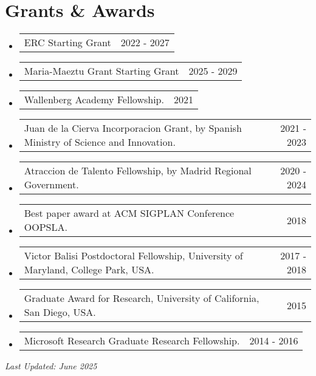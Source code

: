 \documentclass[letterpaper,11pt]{article}
\makeatletter
\newcommand{\resumeProjectHeading}[2]{
    \item
    \begin{tabular*}{0.97\textwidth}{l@{\extracolsep{\fill}}r}
      \small#1 & #2 \\
    \end{tabular*}\vspace{-7pt}
}
\newcommand{\resumeSubHeadingListStart}{\begin{itemize}[leftmargin=0.15in, label={}]}
\newcommand{\resumeSubHeadingListEnd}{\end{itemize}}
\makeatother
\begin{document}
 \section{Grants \& Awards}
 \resumeSubHeadingListStart
 \resumeProjectHeading
     {ERC Starting Grant}{2022 - 2027}
 \resumeProjectHeading
     {Maria-Maeztu Grant Starting Grant}{2025 - 2029}
 \resumeProjectHeading
     {Wallenberg Academy Fellowship.}{2021}
 \resumeProjectHeading
     {Juan de la Cierva Incorporacion Grant, by Spanish Ministry of Science and Innovation.}{2021 - 2023}
 \resumeProjectHeading
     {Atraccion de Talento Fellowship, by Madrid Regional Government.}{2020 - 2024}
 \resumeProjectHeading
     {Best paper award at ACM SIGPLAN Conference OOPSLA.}{2018}
 \resumeProjectHeading
     {Victor Balisi Postdoctoral Fellowship, University of Maryland, College Park, USA.}{2017 - 2018}
 \resumeProjectHeading
     {Graduate Award for Research, University of California, San Diego, USA.}{2015}
 \resumeProjectHeading
     {Microsoft Research Graduate Research Fellowship.}{2014 - 2016}
 \resumeSubHeadingListEnd
 
 \vspace*{\fill}
 \hfill \emph{Last Updated: June 2025}
\end{document}
